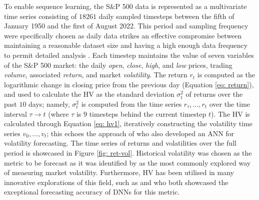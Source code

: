 \documentclass[a4paper, 11pt]{report}
\begin{document}
    To enable sequence learning, the S\&P 500 data is represented as a multivariate time series consisting of $18261$ daily sampled timesteps between the fifth of January 1950 and the first of August 2022. This period and sampling frequency were specifically chosen as daily data strikes an effective compromise between maintaining a reasonable dataset size and having a high enough data frequency to permit detailed analysis \citep{rodikov-2022}. Each timestep maintains the value of seven variables of the S\&P 500 market: the daily \emph{open}, \emph{close}, \emph{high}, and \emph{low} prices, trading \emph{volume}, associated \emph{return}, and market \emph{volatility}. The return $r_t$ is computed as the logarithmic change in closing price from the previous day (Equation \ref{eq: return}), and used to calculate the HV as the standard deviation $\sigma_{t}^2$ of returns over the past $10$ days; namely, $\sigma_{t}^2$ is computed from the time series $r_{\tau}, \ldots, r_{t}$ over the time interval $\tau \to t$ (where $\tau$ is $9$ timesteps behind the current timestep $t$). The HV is calculated through Equation \ref{eq: hv1}, iteratively constructing the volatility time series $v_0, \ldots, v_t$; this echoes the approach of \citet{lahmiri-2017} who also developed an ANN for volatility forecasting. The time series of returns and volatilities over the full period is showcased in Figure \ref{fig: ret-vol}. Historical volatility was chosen as the metric to be forecast as it was identified by \citet{ge-2022} as the most commonly explored way of measuring market volatility. Furthermore, HV has been utilised in many innovative explorations of this field, such as \citet{rahimikia-2020} and \citet{rodikov-2022} who both showcased the exceptional forecasting accuracy of DNNs for this metric.


\end{document}
